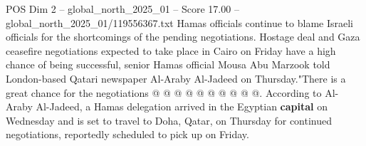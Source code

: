 \begin{textsample}{POS Dim 2 – global\_north\_2025\_01 – Score 17.00 – global\_north\_2025\_01/119556367.txt}
Hamas officials continue to blame Israeli officials for the shortcomings of the pending negotiations.
Hostage deal and Gaza ceasefire negotiations expected to take place in Cairo on Friday have a high chance of being successful, senior Hamas official Mousa Abu Marzook told London-based Qatari newspaper Al-Araby Al-Jadeed on Thursday."There is a great chance for the negotiations @ @ @ @ @ @ @ @ @ @.
According to Al-Araby Al-Jadeed, a Hamas delegation arrived in the Egyptian \textbf{capital} on Wednesday and is set to travel to Doha, Qatar, on Thursday for continued negotiations, reportedly scheduled to pick up on Friday.

\end{textsample}
